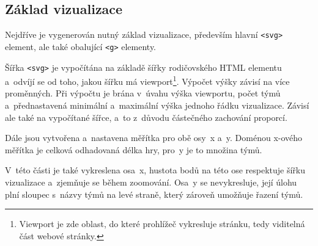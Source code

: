 \documentclass[
  digital, %
  oneside, %
  table,   %
  nolof,     %
  nolot,     %
]{fithesis3}
\begin{document}

\subsection{Základ vizualizace}
Nejdříve je vygenerován nutný základ vizualizace, především hlavní \verb|<svg>| element, ale také obalující \verb|<g>| elementy.\par
Šířka \verb|<svg>| je vypočítána na základě šířky rodičovského HTML elementu a~odvíjí se od toho, jakou šířku má viewport\footnote{Viewport je zde oblast, do které prohlížeč vykresluje stránku, tedy viditelná část webové stránky.}. Výpočet výšky závisí na více proměnných. Při výpočtu je brána v~úvahu výška viewportu, počet týmů a~přednastavená minimální a~maximální výška jednoho řádku vizualizace. Závisí ale také na vypočítané šířce, a~to z~důvodu částečného zachování proporcí.\par
Dále jsou vytvořena a~nastavena měřítka pro obě osy~x a~y. Doménou x-ového měřítka je celková odhadovaná délka hry, pro~y je to množina týmů.\par
V~této části je také vykreslena osa~x, hustota bodů na této ose respektuje šířku vizualizace a~zjemňuje se během zoomování. Osa~y se nevykresluje, její úlohu plní sloupec s~názvy týmů na levé straně, který zároveň umožňuje řazení týmů.
\end{document}
